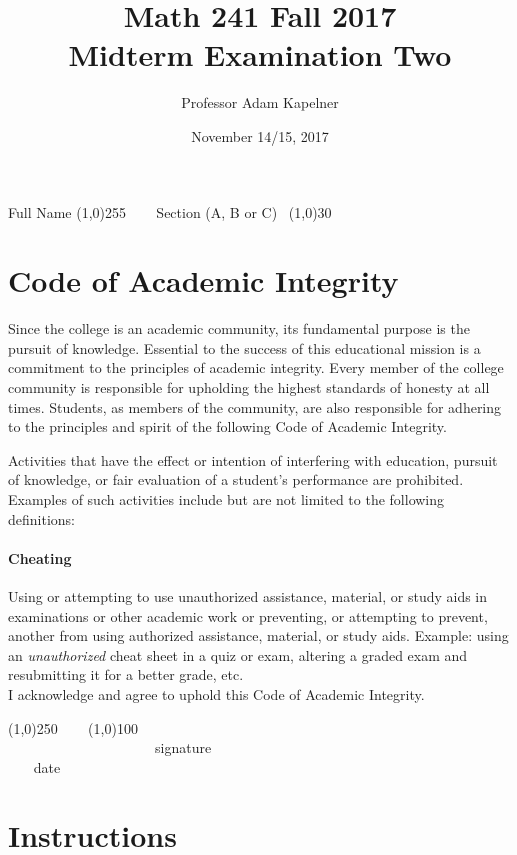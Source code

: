 \documentclass[12pt]{article}
\title{Math 241 Fall 2017 \\ Midterm Examination Two}
\author{Professor Adam Kapelner}
\date{November 14/15, 2017}
\begin{document}
\maketitle

\noindent Full Name \line(1,0){255} ~~~ Section (A, B or C)~ \line(1,0){30}

\thispagestyle{empty}

\section*{Code of Academic Integrity}

\footnotesize
Since the college is an academic community, its fundamental purpose is the pursuit of knowledge. Essential to the success of this educational mission is a commitment to the principles of academic integrity. Every member of the college community is responsible for upholding the highest standards of honesty at all times. Students, as members of the community, are also responsible for adhering to the principles and spirit of the following Code of Academic Integrity.

Activities that have the effect or intention of interfering with education, pursuit of knowledge, or fair evaluation of a student's performance are prohibited. Examples of such activities include but are not limited to the following definitions:

\paragraph{Cheating} Using or attempting to use unauthorized assistance, material, or study aids in examinations or other academic work or preventing, or attempting to prevent, another from using authorized assistance, material, or study aids. Example: using an \emph{unauthorized} cheat sheet in a quiz or exam, altering a graded exam and resubmitting it for a better grade, etc.
\\

\noindent I acknowledge and agree to uphold this Code of Academic Integrity. \\

\begin{center}
\line(1,0){250} ~~~ \line(1,0){100}\\
~~~~~~~~~~~~~~~~~~~~~signature~~~~~~~~~~~~~~~~~~~~~~~~~~~~~~~~~~~~~~~~~~~~~ date
\end{center}

\normalsize

\section*{Instructions}
\end{document}
